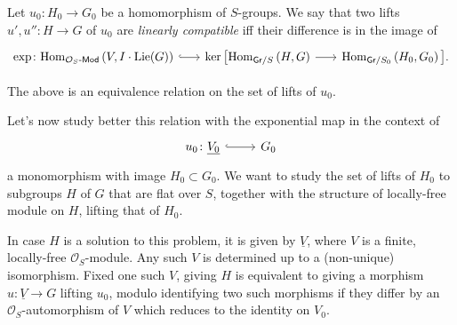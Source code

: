 \begin{defn}\label{defn:LinCompProlong}
	Let $u_0\colon H_0 \to G_0$ be a homomorphism of $S$-groups.
	We say that two lifts $u', u''\colon H \to G$ of $u_0$
	are {\em linearly compatible} iff their difference is in the image
	of 
	\begin{equation*}
	\begin{tikzcd}[row sep = 0ex, column sep = 1.78em
		,/tikz/column 1/.append style={anchor=base east}
		,/tikz/column 2/.append style={anchor=base west}]
		\exp\colon
		\mathrm{Hom}_{ \mathcal{O}_{ S }\text{-}\mathsf{Mod} }
		\left( V, I \cdot \mathrm{Lie}(G) \right)
		\arrow[r, "", hookrightarrow] &
		\ker \big[ 
		\mathrm{Hom}_{ \mathsf{Gr}/S } 
		\left( H, G \right)
		\arrow[r, "", rightarrow] &
		\mathrm{Hom}_{ \mathsf{Gr}/S_0 }
		\left( H_0, G_0 \right)
		\big]
	.\end{tikzcd}
	\end{equation*} 
\end{defn}


\begin{rem}[]
	The above is an equivalence relation on the set of lifts of $u_0$.
\end{rem}


\noindent
Let's now study better this relation with the exponential map in the context of
\begin{equation*}
\begin{tikzcd}[row sep = 0ex
	,/tikz/column 1/.append style={anchor=base east}
	,/tikz/column 2/.append style={anchor=base west}]
	u_0\colon \underline{V_0} 
	\arrow[r, "", hookrightarrow] &
	G_0
\end{tikzcd}
\end{equation*} 
a monomorphism with image $H_0 \subset G_0$.
We want to study the set of lifts of $H_0$ to
subgroups $H$ of $G$ that are flat over $S$, together with the structure
of locally-free module on $H$, lifting that of $H_0$.


\begin{rem}\label{rem:EquivalentLiftingSolutions}
	In case $H$ is a solution to this problem, it is given by
	$\underline{V}$, where $V$ is a finite, locally-free $\mathcal{O}_{ S }$-module.
	Any such $V$ is determined up to a (non-unique) isomorphism.
	Fixed one such $V$, giving $H$ is equivalent to giving a morphism
	$u\colon \underline{V} \to G$ lifting $u_0$, modulo identifying
	two such morphisms if they differ by an $\mathcal{O}_{ S }$-automorphism
	of $V$ which reduces to the identity on $V_0$.
\end{rem}


